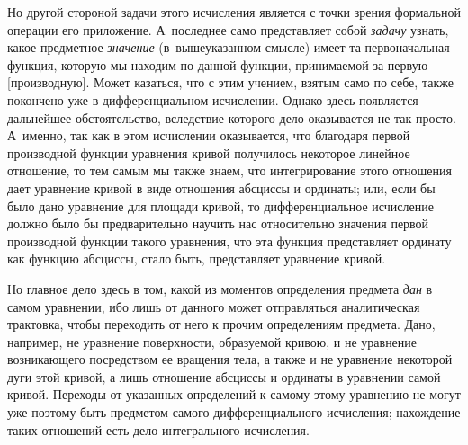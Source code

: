 Но другой стороной задачи этого исчисления является с точки зрения формальной
операции его приложение. А~последнее само представляет собой {\em задачу}
узнать, какое предметное {\em значение} (в~вышеуказанном смысле) имеет та
первоначальная функция, которую мы находим по данной функции, принимаемой за
первую [производную]. Может казаться, что с этим учением, взятым само по себе,
также покончено уже в дифференциальном исчислении. Однако здесь появляется
дальнейшее обстоятельство, вследствие которого дело оказывается не так просто.
А~именно, так как в этом исчислении оказывается, что благодаря первой
производной функции уравнения кривой получилось некоторое линейное отношение,
то тем самым мы также знаем, что интегрирование этого отношения дает уравнение
кривой в виде отношения абсциссы и ординаты; или, если бы было дано уравнение
для площади кривой, то дифференциальное исчисление должно было бы
предварительно научить нас относительно значения первой производной функции
такого уравнения, что эта функция представляет ординату как функцию абсциссы,
стало быть, представляет уравнение кривой.

Но главное дело здесь в том, какой из моментов определения предмета {\em дан}
в самом уравнении, ибо лишь от данного может отправляться аналитическая
трактовка, чтобы переходить от него к прочим определениям предмета. Дано,
например, не уравнение поверхности, образуемой кривою, и не уравнение
возникающего посредством ее вращения тела, а также и не уравнение некоторой
дуги этой кривой, а лишь отношение абсциссы и ординаты в уравнении самой
кривой. Переходы от указанных определений к самому этому уравнению не могут уже
поэтому быть предметом самого дифференциального исчисления; нахождение таких
отношений есть дело интегрального исчисления.


